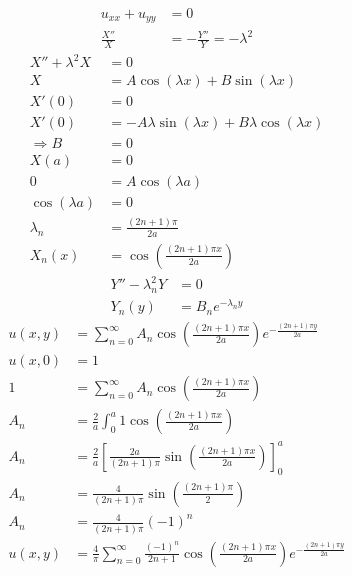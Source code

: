 \documentclass[../../HW08.tex]{subfiles}
\begin{document}
\begin{align*}
    u_{xx}+u_{yy} & =0                              \\
    \frac{X''}{X} & = -\frac{Y''}{Y} = -\lambda^{2}
\end{align*}
\begin{align*}
    X''+\lambda^{2}X & =0                                                     \\
    X                & =A\cos(\lambda x)+B\sin(\lambda x)                     \\
    X'(0)            & = 0                                                    \\
    X'(0)            & = -A\lambda \sin(\lambda x) + B\lambda \cos(\lambda x) \\
    \Rightarrow  B   & =0                                                     \\
    X(a)             & = 0                                                    \\
    0                & = A\cos(\lambda a)                                     \\
    \cos(\lambda a)  & = 0                                                    \\
    \lambda_{n}      & = \frac{(2n+1)\pi}{2a}                                 \\
    X_{n}(x)         & = \cos\left(  \frac{(2n+1)\pi x}{2a}\right)
\end{align*}
\begin{align*}
    Y''-\lambda_{n}^{2}Y & =0                       \\
    Y_{n}(y)             & = B_{n}e^{-\lambda_{n}y}
\end{align*}
\begin{align*}
    u(x,y) & = \sum_{n=0}^{\infty}A_{n}\cos\left(  \frac{(2n+1)\pi x}{2a}\right)e^{-\frac{(2n+1)\pi y}{2a}}                                 \\
    u(x,0) & = 1                                                                                                                            \\
    1      & = \sum_{n=0}^{\infty}A_{n}\cos\left(  \frac{(2n+1)\pi x}{2a}\right)                                                            \\
    A_{n}  & = \frac{2}{a} \int_{0}^{a}1 \cos\left(  \frac{(2n+1)\pi x}{2a}\right)                                                          \\
    A_{n}  & = \frac{2}{a} \left[ \frac{2a}{(2n+1)\pi} \sin\left( \frac{(2n+1)\pi x}{2a} \right) \right]_{0}^{a}                            \\
    A_{n}  & = \frac{4}{(2n+1)\pi} \sin\left( \frac{(2n+1) \pi }{2} \right)                                                                 \\
    A_{n}  & = \frac{4}{(2n+1)\pi} (-1)^{n}                                                                                                 \\
    u(x,y) & = \frac{4}{\pi} \sum_{n=0}^{\infty} \frac{(-1)^{n}}{2n+1} \cos\left(  \frac{(2n+1)\pi x}{2a}\right)e^{-\frac{(2n+1)\pi y}{2a}}
\end{align*}
\end{document}

